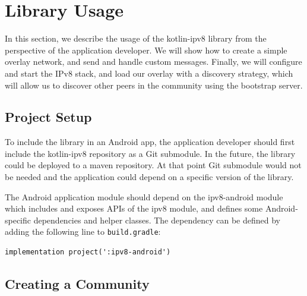 


\iffalse
\section{Library Usage}

In this section, we describe the usage of the kotlin-ipv8 library from the perspective of the application developer. We will show how to create a simple overlay network, and send and handle custom messages. Finally, we will configure and start the IPv8 stack, and load our overlay with a discovery strategy, which will allow us to discover other peers in the community using the bootstrap server.

\subsection{Project Setup}

To include the library in an Android app, the application developer should first include the kotlin-ipv8 repository as a Git submodule. In the future, the library could be deployed to a maven repository. At that point Git submodule would not be needed and the application could depend on a specific version of the library.

The Android application module should depend on the ipv8-android module which includes and exposes APIs of the ipv8 module, and defines some Android-specific dependencies and helper classes. The dependency can be defined by adding the following line to \texttt{build.gradle}:

\begin{verbatim}
implementation project(':ipv8-android')
\end{verbatim}

\subsection{Creating a Community}

